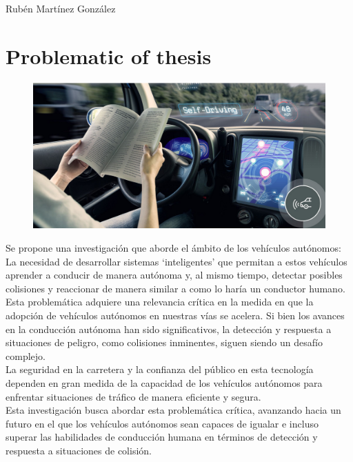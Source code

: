 \documentclass[10pt,letterpaper,final]{article}
\begin{document}
    \section*{}
    Rubén Martínez González
    \section*{Problematic of thesis}
    \begin{figure}[!ht]
        \includegraphics[width=\textwidth]{img/1}\label{fig:self-driving}
    \end{figure}
    \newline
    \noindent Se propone una investigación que aborde el ámbito de los vehículos autónomos:\\
    La necesidad de desarrollar sistemas ‘inteligentes' que permitan a estos vehículos aprender a conducir de manera autónoma y,
    al mismo tiempo, detectar posibles colisiones y reaccionar de manera similar a como lo haría un conductor humano.\\
    Esta problemática adquiere una relevancia crítica en la medida en que la adopción de vehículos autónomos en nuestras
    vías se acelera. Si bien los avances en la conducción autónoma han sido significativos, la detección y respuesta a
    situaciones de peligro, como colisiones inminentes, siguen siendo un desafío complejo.\\
    La seguridad en la carretera y la confianza del público en esta tecnología dependen en gran medida de la capacidad
    de los vehículos autónomos para enfrentar situaciones de tráfico de manera eficiente y segura.\\
    Esta investigación busca abordar esta problemática crítica, avanzando hacia un futuro en el que los vehículos autónomos
    sean capaces de igualar e incluso superar las habilidades de conducción humana en términos de detección y respuesta
    a situaciones de colisión.
    \pagebreak
\end{document}
